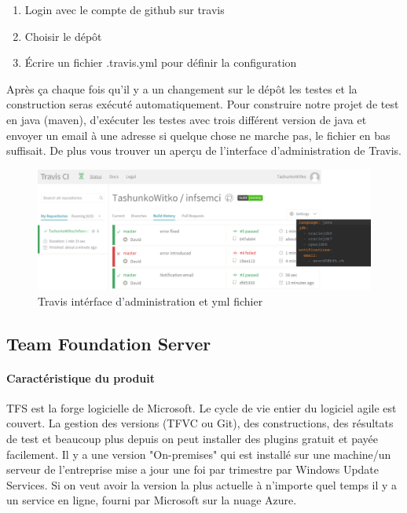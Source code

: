 \begin{enumerate}
	\item Login avec le compte de github sur travis
	\item Choisir le dépôt
	\item Écrire un fichier .travis.yml pour définir la configuration
\end{enumerate}

Après ça chaque fois qu'il y a un changement sur le dépôt les testes et la construction seras exécuté automatiquement. Pour construire notre projet de test en java (maven), d'exécuter les testes avec trois différent version de java et envoyer un email à une adresse si quelque chose ne marche pas, le fichier en bas suffisait. De plus vous trouver un aperçu de l'interface d'administration de Travis.

\begin{figure}[H]
	\centering
		\includegraphics[scale=0.2]{bilder/travisciymlfile}
	\caption{Travis intérface d'administration et yml fichier}
	\label{fig:travisgui}
\end{figure}





\clearpage
\subsection{Team Foundation Server}
\paragraph{Caractéristique du produit} TFS est la forge logicielle de Microsoft. Le cycle de vie entier du logiciel agile est couvert. La gestion des versions (TFVC ou Git), des constructions, des résultats de test et beaucoup plus depuis on peut installer des plugins gratuit et payée facilement. Il y a une version "On-premises" qui est installé sur une machine/un serveur de l'entreprise mise a jour une foi par trimestre par Windows Update Services. Si on veut avoir la version la plus actuelle à n'importe quel temps il y a un service en ligne, fourni par Microsoft sur la nuage Azure.

